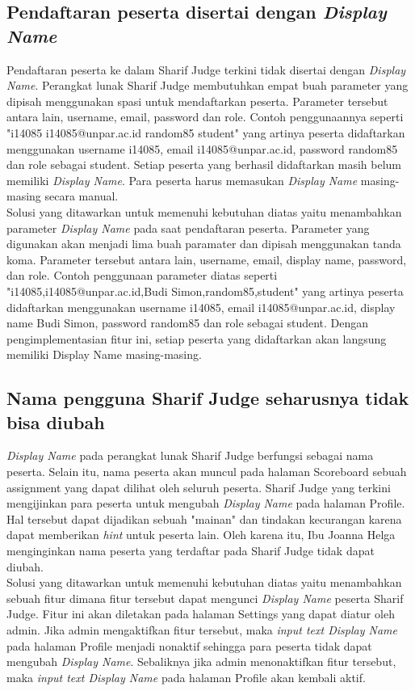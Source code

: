 \subsection{Pendaftaran peserta disertai dengan \textit{Display Name}}
Pendaftaran peserta ke dalam Sharif Judge terkini tidak disertai dengan \textit{Display Name}. Perangkat lunak Sharif Judge membutuhkan empat buah parameter yang dipisah menggunakan spasi untuk mendaftarkan peserta. Parameter tersebut antara lain, username, email, password dan role. Contoh penggunaannya seperti "i14085 i14085@unpar.ac.id random85 student" yang artinya peserta didaftarkan menggunakan username i14085, email i14085@unpar.ac.id, password random85 dan role sebagai student. Setiap peserta yang berhasil didaftarkan masih belum memiliki \textit{Display Name}. Para peserta harus memasukan \textit{Display Name} masing-masing secara manual. \\
Solusi yang ditawarkan untuk memenuhi kebutuhan diatas yaitu menambahkan parameter \textit{Display Name} pada saat pendaftaran peserta. Parameter yang digunakan akan menjadi lima buah paramater dan dipisah menggunakan tanda koma. Parameter tersebut antara lain, username, email, display name, password, dan role. Contoh penggunaan parameter diatas seperti "i14085,i14085@unpar.ac.id,Budi Simon,random85,student" yang artinya peserta didaftarkan menggunakan username i14085, email i14085@unpar.ac.id, display name Budi Simon, password random85 dan role sebagai student. Dengan pengimplementasian fitur ini, setiap peserta yang didaftarkan akan langsung memiliki Display Name masing-masing.

\subsection{Nama pengguna Sharif Judge seharusnya tidak bisa diubah}
\textit{Display Name} pada perangkat lunak Sharif Judge berfungsi sebagai nama peserta. Selain itu, nama peserta akan muncul pada halaman Scoreboard sebuah assignment yang dapat dilihat oleh seluruh peserta. Sharif Judge yang terkini mengijinkan para peserta untuk mengubah \textit{Display Name} pada halaman Profile. Hal tersebut dapat dijadikan sebuah "mainan" dan tindakan kecurangan karena dapat memberikan \textit{hint} untuk peserta lain. Oleh karena itu, Ibu Joanna Helga menginginkan nama peserta yang terdaftar pada Sharif Judge tidak dapat diubah. \\
Solusi yang ditawarkan untuk memenuhi kebutuhan diatas yaitu menambahkan sebuah fitur dimana fitur tersebut dapat mengunci \textit{Display Name} peserta Sharif Judge. Fitur ini akan diletakan pada halaman Settings yang dapat diatur oleh admin. Jika admin mengaktifkan fitur tersebut, maka \textit{input text Display Name} pada halaman Profile menjadi nonaktif sehingga para peserta tidak dapat mengubah \textit{Display Name}. Sebaliknya jika admin menonaktifkan fitur tersebut, maka \textit{input text Display Name} pada halaman Profile akan kembali aktif.

